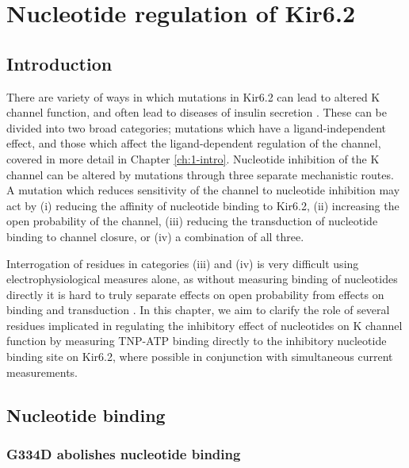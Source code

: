 \chapter{\label{ch:5}Nucleotide regulation of Kir6.2} 

\graphicspath{{figures/ch5/}}

\minitoc

\section{Introduction}

There are variety of ways in which mutations in Kir6.2 can lead to altered K\ATP{} channel function, and often lead to diseases of insulin secretion \cite{ashcroft_katp_2013, aguilar-bryan_neonatal_2008, hattersley_activating_2005, ashcroft_neonatal_2017, flanagan_update_2009, ashcroft_diabetes_2012, pipatpolkai_new_2020-1}.
These can be divided into two broad categories; mutations which have a ligand-independent effect, and those which affect the ligand-dependent regulation of the channel, covered in more detail in Chapter \ref{ch:1-intro}.
Nucleotide inhibition of the K\ATP{} channel can be altered by mutations through three separate mechanistic routes.
A mutation which reduces sensitivity of the channel to nucleotide inhibition may act by (i) reducing the affinity of nucleotide binding to Kir6.2, (ii) increasing the open probability of the channel, (iii) reducing the transduction of nucleotide binding to channel closure, or (iv) a combination of all three.

Interrogation of residues in categories (iii) and (iv) is very difficult using electrophysiological measures alone, as without measuring binding of nucleotides directly it is hard to truly separate effects on open probability from effects on binding and transduction \cite{colquhoun_binding_1998}.
In this chapter, we aim to clarify the role of several residues implicated in regulating the inhibitory effect of nucleotides on K\ATP{} channel function by measuring TNP-ATP binding directly to the inhibitory nucleotide binding site on Kir6.2, where possible in conjunction with simultaneous current measurements.

\section{Nucleotide binding}

\subsection{G334D abolishes nucleotide binding}

